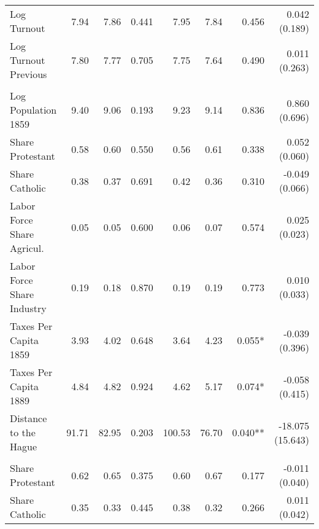 \begin{table}[!h]
\begin{threeparttable}
\begin{tabular}[t]{lrrrrrrr}
\hspace{1em}Log Turnout & \num{7.94} & \num{7.86} & 0.441 & \num{7.95} & \num{7.84} & 0.456 & 0.042 (0.189)\\
\hspace{1em}Log Turnout Previous & \num{7.80} & \num{7.77} & 0.705 & \num{7.75} & \num{7.64} & 0.490 & 0.011 (0.263)\\
\addlinespace[0.3em]
\multicolumn{8}{l}{\textbf{Panel D: Birthplace Characteristics}}\\
\hspace{1em}Log Population 1859 & \num{9.40} & \num{9.06} & 0.193 & \num{9.23} & \num{9.14} & 0.836 & 0.860 (0.696)\\
\hspace{1em}Share Protestant & \num{0.58} & \num{0.60} & 0.550 & \num{0.56} & \num{0.61} & 0.338 & 0.052 (0.060)\\
\hspace{1em}Share Catholic & \num{0.38} & \num{0.37} & 0.691 & \num{0.42} & \num{0.36} & 0.310 & -0.049 (0.066)\\
\hspace{1em}Labor Force Share Agricul. & \num{0.05} & \num{0.05} & 0.600 & \num{0.06} & \num{0.07} & 0.574 & 0.025 (0.023)\\
\hspace{1em}Labor Force Share Industry & \num{0.19} & \num{0.18} & 0.870 & \num{0.19} & \num{0.19} & 0.773 & 0.010 (0.033)\\
\hspace{1em}Taxes Per Capita 1859 & \num{3.93} & \num{4.02} & 0.648 & \num{3.64} & \num{4.23} & 0.055* & -0.039 (0.396)\\
\hspace{1em}Taxes Per Capita 1889 & \num{4.84} & \num{4.82} & 0.924 & \num{4.62} & \num{5.17} & 0.074* & -0.058 (0.415)\\
\hspace{1em}Distance to the Hague & \num{91.71} & \num{82.95} & 0.203 & \num{100.53} & \num{76.70} & 0.040** & -18.075 (15.643)\\
\addlinespace[0.3em]
\multicolumn{8}{l}{\textbf{Panel E: District Characteristics}}\\
\hspace{1em}Share Protestant & \num{0.62} & \num{0.65} & 0.375 & \num{0.60} & \num{0.67} & 0.177 & -0.011 (0.040)\\
\hspace{1em}Share Catholic & \num{0.35} & \num{0.33} & 0.445 & \num{0.38} & \num{0.32} & 0.266 & 0.011 (0.042)\\

\end{tabular}
\end{threeparttable}
\end{table}
